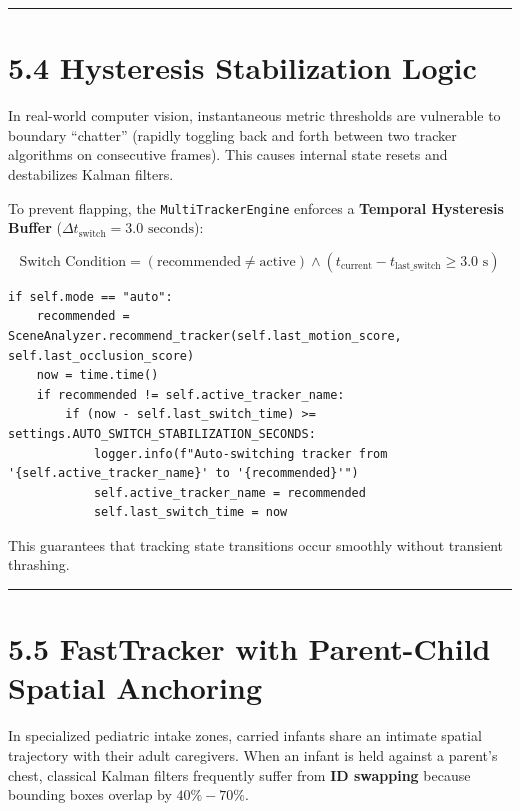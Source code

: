 \begin{center}\rule{0.5\linewidth}{0.5pt}\end{center}

\section{5.4 Hysteresis Stabilization
Logic}\label{hysteresis-stabilization-logic}

In real-world computer vision, instantaneous metric thresholds are
vulnerable to boundary ``chatter'' (rapidly toggling back and forth
between two tracker algorithms on consecutive frames). This causes
internal state resets and destabilizes Kalman filters.

To prevent flapping, the \texttt{MultiTrackerEngine} enforces a
\textbf{Temporal Hysteresis Buffer}
(\(\Delta t_{\text{switch}} = 3.0\text{ seconds}\)):

\[\text{Switch Condition} = (\text{recommended} \ne \text{active}) \land (t_{\text{current}} - t_{\text{last\_switch}} \ge 3.0\text{ s})\]

\begin{verbatim}
if self.mode == "auto":
    recommended = SceneAnalyzer.recommend_tracker(self.last_motion_score, self.last_occlusion_score)
    now = time.time()
    if recommended != self.active_tracker_name:
        if (now - self.last_switch_time) >= settings.AUTO_SWITCH_STABILIZATION_SECONDS:
            logger.info(f"Auto-switching tracker from '{self.active_tracker_name}' to '{recommended}'")
            self.active_tracker_name = recommended
            self.last_switch_time = now
\end{verbatim}

This guarantees that tracking state transitions occur smoothly without
transient thrashing.

\begin{center}\rule{0.5\linewidth}{0.5pt}\end{center}

\section{5.5 FastTracker with Parent-Child Spatial
Anchoring}\label{fasttracker-with-parent-child-spatial-anchoring}

In specialized pediatric intake zones, carried infants share an intimate
spatial trajectory with their adult caregivers. When an infant is held
against a parent's chest, classical Kalman filters frequently suffer
from \textbf{ID swapping} because bounding boxes overlap by
\(40\% - 70\%\).

